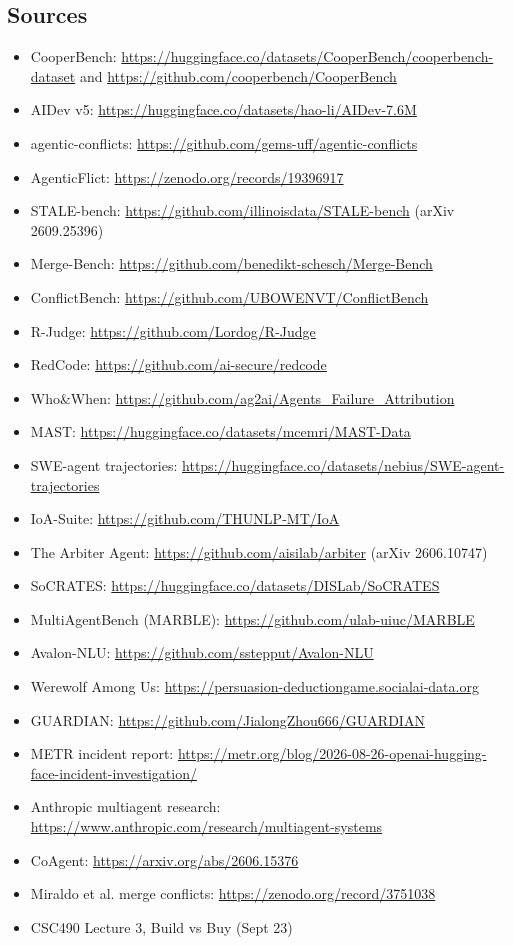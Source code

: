 \documentclass[11pt]{article}
\begin{document}
\clearpage
\subsection*{Sources}

{\small
\begin{itemize}
  \item CooperBench: \url{https://huggingface.co/datasets/CooperBench/cooperbench-dataset} and \url{https://github.com/cooperbench/CooperBench}
  \item AIDev v5: \url{https://huggingface.co/datasets/hao-li/AIDev-7.6M}
  \item agentic-conflicts: \url{https://github.com/gems-uff/agentic-conflicts}
  \item AgenticFlict: \url{https://zenodo.org/records/19396917}
  \item STALE-bench: \url{https://github.com/illinoisdata/STALE-bench} (arXiv 2609.25396)
  \item Merge-Bench: \url{https://github.com/benedikt-schesch/Merge-Bench}
  \item ConflictBench: \url{https://github.com/UBOWENVT/ConflictBench}
  \item R-Judge: \url{https://github.com/Lordog/R-Judge}
  \item RedCode: \url{https://github.com/ai-secure/redcode}
  \item Who\&When: \url{https://github.com/ag2ai/Agents_Failure_Attribution}
  \item MAST: \url{https://huggingface.co/datasets/mcemri/MAST-Data}
  \item SWE-agent trajectories: \url{https://huggingface.co/datasets/nebius/SWE-agent-trajectories}
  \item IoA-Suite: \url{https://github.com/THUNLP-MT/IoA}
  \item The Arbiter Agent: \url{https://github.com/aisilab/arbiter} (arXiv 2606.10747)
  \item SoCRATES: \url{https://huggingface.co/datasets/DISLab/SoCRATES}
  \item MultiAgentBench (MARBLE): \url{https://github.com/ulab-uiuc/MARBLE}
  \item Avalon-NLU: \url{https://github.com/sstepput/Avalon-NLU}
  \item Werewolf Among Us: \url{https://persuasion-deductiongame.socialai-data.org}
  \item GUARDIAN: \url{https://github.com/JialongZhou666/GUARDIAN}
  \item METR incident report: \url{https://metr.org/blog/2026-08-26-openai-hugging-face-incident-investigation/}
  \item Anthropic multiagent research: \url{https://www.anthropic.com/research/multiagent-systems}
  \item CoAgent: \url{https://arxiv.org/abs/2606.15376}
  \item Miraldo et al. merge conflicts: \url{https://zenodo.org/record/3751038}
  \item CSC490 Lecture 3, Build vs Buy (Sept 23)
\end{itemize}
}
\end{document}

